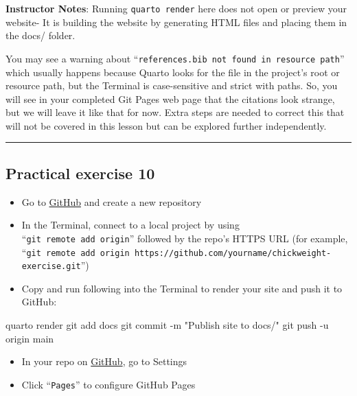 \documentclass[
  letterpaper,
  DIV=11,
  numbers=noendperiod]{scrartcl}
\newenvironment{Shaded}{\begin{snugshade}}{\end{snugshade}}
\newcommand{\NormalTok}[1]{\textcolor[rgb]{0.00,0.23,0.31}{#1}}
\providecommand{\tightlist}{%
  \setlength{\itemsep}{0pt}\setlength{\parskip}{0pt}}
\begin{document}
\textbf{Instructor Notes}: Running \texttt{quarto\ render} here does not
open or preview your website- It is building the website by generating
HTML files and placing them in the docs/ folder.

You may see a warning about
``\texttt{references.bib\ not\ found\ in\ resource\ path}'' which
usually happens because Quarto looks for the file in the project's root
or resource path, but the Terminal is case-sensitive and strict with
paths. So, you will see in your completed Git Pages web page that the
citations look strange, but we will leave it like that for now. Extra
steps are needed to correct this that will not be covered in this lesson
but can be explored further independently.

\begin{center}\rule{0.5\linewidth}{0.5pt}\end{center}

\subsection{Practical exercise 10}\label{practical-exercise-10-3}

\begin{itemize}
\tightlist
\item[$\square$]
  Go to \href{github.com}{GitHub} and create a new repository
\item[$\square$]
  In the Terminal, connect to a local project by using
  ``\texttt{git\ remote\ add\ origin}'' followed by the repo's HTTPS URL
  (for example,
  ``\texttt{git\ remote\ add\ origin\ https://github.com/yourname/chickweight-exercise.git}'')
\item[$\square$]
  Copy and run following into the Terminal to render your site and push
  it to GitHub:
\end{itemize}

\begin{Shaded}
\begin{Highlighting}[]
\NormalTok{quarto render}
\NormalTok{git add docs}
\NormalTok{git commit {-}m "Publish site to docs/"}
\NormalTok{git push {-}u origin main}
\end{Highlighting}
\end{Shaded}

\begin{itemize}
\tightlist
\item[$\square$]
  In your repo on \href{github.com}{GitHub}, go to Settings
\item[$\square$]
  Click ``\texttt{Pages}'' to configure GitHub Pages
\end{itemize}
\end{document}
